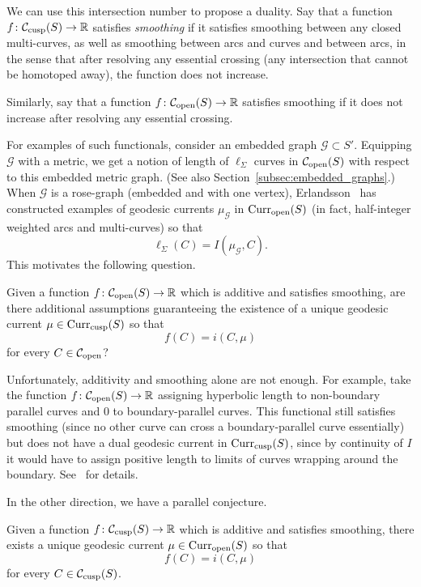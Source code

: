 We can use this intersection number to propose a duality. Say that a
function $f \colon \mathcal{C}_{\mathrm{cusp}}(S) \to \mathbb{R}$
satisfies \emph{smoothing} if it satisfies smoothing between any
closed multi-curves, as well as smoothing between arcs and curves and
between arcs, in the sense that after resolving any essential crossing
(any intersection that cannot be homotoped away), the function does
not increase.

Similarly, say that a function
$f \colon \mathcal{C}_{\mathrm{open}}(S) \to \mathbb{R}$ satisfies
smoothing if it does not increase after resolving any essential
crossing.

For examples of such functionals, consider an embedded graph $\mathcal{G} \subset S'$.
Equipping $\mathcal{G}$ with a metric, we get a notion of length of
$\ell_\Sigma$ curves in $\mathcal{C}_{\mathrm{open}}(S)$ with respect to
this embedded metric graph. (See also
Section~\ref{subsec:embedded_graphs}.) When $\mathcal{G}$ is a rose-graph
(embedded and
with one vertex), Erlandsson~\cite{Erlandsson:WordLength} has
constructed examples of geodesic currents $\mu_{\mathcal{G}}$ in
$\operatorname{Curr}_{\mathrm{open}}(S)$ (in fact, half-integer weighted arcs and
multi-curves) so that
\[
\ell_{\Sigma}(C)=I(\mu_{\mathcal{G}}, C).
\]
This motivates the following question.

\begin{question}\label{quest:open-to-cusp}
Given a function $f \colon \mathcal{C}_{\mathrm{open}}(S) \to \mathbb{R}$
which is additive and satisfies smoothing, are there additional
assumptions guaranteeing the existence of a unique geodesic current $\mu \in \operatorname{Curr}_{\mathrm{cusp}}(S)$ so that
\[
f(C)=i(C, \mu)
\]
for every $C \in \mathcal{C}_{\mathrm{open}}$?
\end{question}

Unfortunately, additivity and smoothing alone are not enough. For
example, take the function
$f \colon \mathcal{C}_{\mathrm{open}}(S) \to \mathbb{R}$ assigning
hyperbolic length to non-boundary parallel curves and $0$ to
boundary-parallel curves. This functional still satisfies smoothing
(since no other curve can cross a boundary-parallel curve essentially)
but does not have a dual geodesic current in
$\operatorname{Curr}_{\mathrm{cusp}}(S)$, since by continuity of $I$ it would have
to assign positive length to limits of curves wrapping around the
boundary. See~\cite[Remark~2.26]{MGT21:Smoothings} for details.

In the other direction, we have a parallel conjecture.

\begin{conjecture}\label{conj:cusp-to-open}
Given a function $f \colon \mathcal{C}_{\mathrm{cusp}}(S) \to \mathbb{R}$ which is additive and satisfies smoothing, there exists a unique geodesic current $\mu \in \operatorname{Curr}_{\mathrm{open}}(S)$ so that
\[
f(C)=i(C, \mu)
\]
for every $C \in \mathcal{C}_{\mathrm{cusp}}(S)$.
\end{conjecture}

